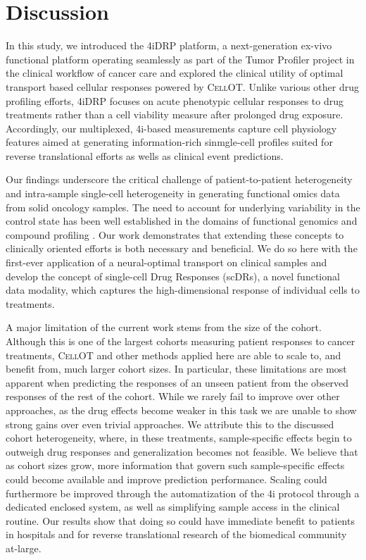\section{Discussion}
In this study, we introduced the 4iDRP platform, a next-generation ex-vivo functional platform operating seamlessly as part of the Tumor Profiler project in the clinical workflow of cancer care and explored the clinical utility of optimal transport based cellular responses powered by \textsc{CellOT}.
Unlike various other drug profiling efforts, 4iDRP focuses on acute phenotypic cellular responses to drug treatments rather than a cell viability measure after prolonged drug exposure. 
Accordingly, our multiplexed, 4i-based measurements capture cell physiology features aimed at generating information-rich sinmgle-cell profiles suited for reverse translational efforts as wells as clinical event predictions. 

Our findings underscore the critical challenge of patient-to-patient heterogeneity and intra-sample single-cell heterogeneity in generating functional omics data from solid oncology samples.
The need to account for underlying variability in the control state has been well established in the domains of functional genomics and compound profiling \cite{need}.
Our work demonstrates that extending these concepts to clinically oriented efforts is both necessary and beneficial.
We do so here with the first-ever application of a neural-optimal transport on clinical samples and develop the concept of single-cell Drug Responses (scDRs), a novel functional data modality, which captures the high-dimensional response of individual cells to treatments.

A major limitation of the current work stems from the size of the cohort.
Although this is one of the largest cohorts measuring patient responses to cancer treatments, \textsc{CellOT} and other methods applied here are able to scale to, and benefit from, much larger cohort sizes.
In particular, these limitations are most apparent when predicting the responses of an unseen patient from the observed responses of the rest of the cohort.
While we rarely fail to improve over other approaches, as the drug effects become weaker in this task we are unable to show strong gains over even trivial approaches.
We attribute this to the discussed cohort heterogeneity,
where, in these treatments, sample-specific effects begin to outweigh drug responses and generalization becomes not feasible.
We believe that as cohort sizes grow, more information that govern such sample-specific effects could become available and improve prediction performance.
Scaling could furthermore be improved through the automatization of the 4i protocol through a dedicated enclosed system, as well as simplifying sample access in the clinical routine.
Our results show that doing so could have immediate benefit to patients in hospitals and for reverse translational research of the biomedical community at-large.  

